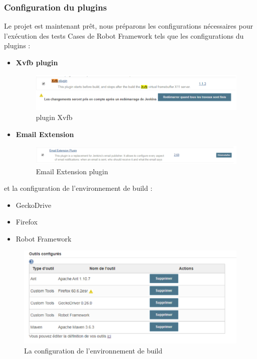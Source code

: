 \subsubsection{Configuration du plugins}
Le projet est maintenant prêt, nous préparons les configurations nécessaires pour l'exécution des tests Cases de Robot Framework tels que les configurations du plugins :
\begin{itemize}
	\item \textbf{Xvfb plugin }
	\begin{figure}[H]
		\centering
		\includegraphics[width=0.9\linewidth]{img/jenkins/xvfb}
		\caption[plugin Xvfb]{plugin Xvfb}
		\label{fig:xvfb}
	\end{figure}
	
	\item \textbf{Email Extension}
	\begin{figure}[H]
		\centering
		\includegraphics[width=0.9\linewidth]{img/jenkins/email}
		\caption[Email Extension plugin]{Email Extension plugin}
		\label{fig:email}
	\end{figure}
	
\end{itemize}
\newpage
et la configuration de l'environnement de build :
\begin{itemize}
	\item GeckoDrive
	\item Firefox
	\item Robot Framework
\end{itemize}
\begin{figure}[H]
	\centering
	\includegraphics[width=0.7\linewidth]{img/jenkins/env-build}
	\caption[La configuration de l'environnement de build]{La configuration de l'environnement de build}
	\label{fig:env-build}
\end{figure}
